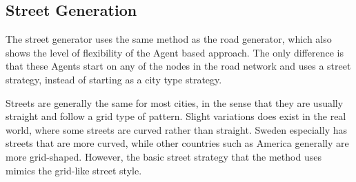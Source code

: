 \subsection{Street Generation}
The street generator uses the same method as the road generator, which also
shows the level of flexibility of the Agent based approach. The only difference
is that these Agents start on any of the nodes in the road network and uses a
street strategy, instead of starting as a city type strategy.

Streets are generally the same for most cities, in the sense that they are
usually straight and follow a grid type of pattern. Slight variations does exist
in the real world, where some streets are curved rather than straight. Sweden
especially has streets that are more curved, while other countries such as
America generally are more grid-shaped. However, the basic street strategy that
the method uses mimics the grid-like street style.
